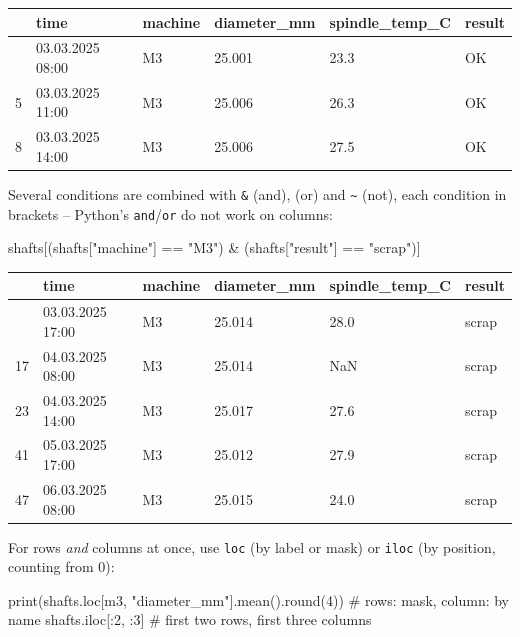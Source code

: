 \documentclass[
  letterpaper,
  DIV=11,
  numbers=noendperiod]{scrreprt}
\newenvironment{Shaded}{\begin{snugshade}}{\end{snugshade}}
\newcommand{\BuiltInTok}[1]{\textcolor[rgb]{0.00,0.23,0.31}{#1}}
\newcommand{\CommentTok}[1]{\textcolor[rgb]{0.37,0.37,0.37}{#1}}
\newcommand{\DecValTok}[1]{\textcolor[rgb]{0.68,0.00,0.00}{#1}}
\newcommand{\NormalTok}[1]{\textcolor[rgb]{0.00,0.23,0.31}{#1}}
\newcommand{\OperatorTok}[1]{\textcolor[rgb]{0.37,0.37,0.37}{#1}}
\newcommand{\StringTok}[1]{\textcolor[rgb]{0.13,0.47,0.30}{#1}}
\begin{document}
\begin{longtable}[]{@{}llllll@{}}
\toprule\noalign{}
& time & machine & diameter\_mm & spindle\_temp\_C & result \\
\midrule\noalign{}
\endhead
\bottomrule\noalign{}
\endlastfoot
2 & 03.03.2025 08:00 & M3 & 25.001 & 23.3 & OK \\
5 & 03.03.2025 11:00 & M3 & 25.006 & 26.3 & OK \\
8 & 03.03.2025 14:00 & M3 & 25.006 & 27.5 & OK \\
\end{longtable}

Several conditions are combined with \texttt{\&} (and),
\texttt{\textbar{}} (or) and \texttt{\textasciitilde{}} (not), each
condition in brackets -- Python's \texttt{and}/\texttt{or} do not work
on columns:

\begin{Shaded}
\begin{Highlighting}[]
\NormalTok{shafts[(shafts[}\StringTok{"machine"}\NormalTok{] }\OperatorTok{==} \StringTok{"M3"}\NormalTok{) }\OperatorTok{\&}\NormalTok{ (shafts[}\StringTok{"result"}\NormalTok{] }\OperatorTok{==} \StringTok{"scrap"}\NormalTok{)]}
\end{Highlighting}
\end{Shaded}

\begin{longtable}[]{@{}llllll@{}}
\toprule\noalign{}
& time & machine & diameter\_mm & spindle\_temp\_C & result \\
\midrule\noalign{}
\endhead
\bottomrule\noalign{}
\endlastfoot
11 & 03.03.2025 17:00 & M3 & 25.014 & 28.0 & scrap \\
17 & 04.03.2025 08:00 & M3 & 25.014 & NaN & scrap \\
23 & 04.03.2025 14:00 & M3 & 25.017 & 27.6 & scrap \\
41 & 05.03.2025 17:00 & M3 & 25.012 & 27.9 & scrap \\
47 & 06.03.2025 08:00 & M3 & 25.015 & 24.0 & scrap \\
\end{longtable}

For rows \emph{and} columns at once, use \texttt{loc} (by label or mask)
or \texttt{iloc} (by position, counting from 0):

\begin{Shaded}
\begin{Highlighting}[]
\BuiltInTok{print}\NormalTok{(shafts.loc[m3, }\StringTok{"diameter\_mm"}\NormalTok{].mean().}\BuiltInTok{round}\NormalTok{(}\DecValTok{4}\NormalTok{))   }\CommentTok{\# rows: mask, column: by name}
\NormalTok{shafts.iloc[:}\DecValTok{2}\NormalTok{, :}\DecValTok{3}\NormalTok{]                              }\CommentTok{\# first two rows, first three columns}
\end{Highlighting}
\end{Shaded}
\end{document}
